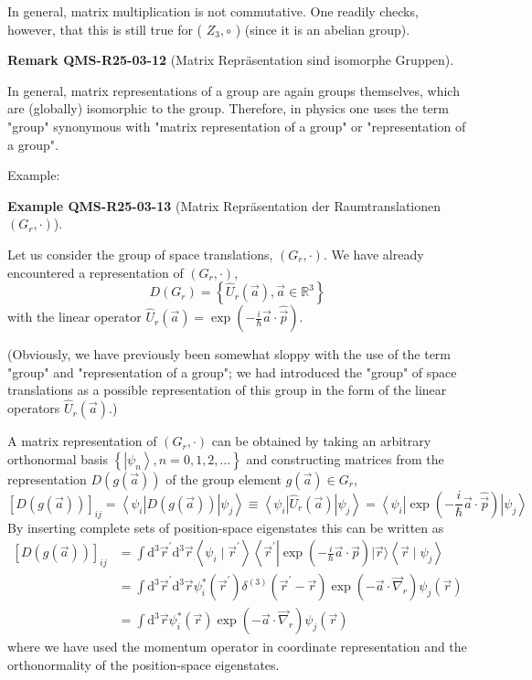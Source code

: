 \documentclass[10pt, letterpaper]{article}
\newcommand{\CustomHeading}[3]{%
  \par\medskip\noindent%
  \textbf{#1 #2} \textnormal{(#3)}.\enskip%
}
\newenvironment{REM}[2]{\begin{unitbox}\CustomHeading{Remark}{#1}{#2}}{\end{unitbox}}
\newenvironment{EXA}[2]{\begin{unitbox}\CustomHeading{Example}{#1}{#2}}{\end{unitbox}}
\begin{document}
In general, matrix multiplication is not commutative. One readily checks, however, that this is still true for ( $Z_{3}, \circ$ ) (since it is an abelian group).



\begin{REM}{QMS-R25-03-12}{Matrix Repräsentation sind isomorphe Gruppen}
In general, matrix representations of a group are again groups themselves, which are (globally) isomorphic to the group. Therefore, in physics one uses the term "group" synonymous with "matrix representation of a group" or "representation of a group".
\end{REM}

Example: 

\begin{EXA}{QMS-R25-03-13}{Matrix Repräsentation der Raumtranslationen $(G_{r}, \cdot)$}
Let us consider the group of space translations, $\left(G_{r}, \cdot\right)$. We have already encountered a representation of $\left(G_{r}, \cdot\right)$,
$$
D\left(G_{r}\right)=\left\{\hat{U}_{r}(\vec{a}), \vec{a} \in \mathbb{R}^{3}\right\}
$$
with the linear operator $\hat{U}_{r}(\vec{a})=\exp \left(-\frac{i}{\hbar} \vec{a} \cdot \hat{\vec{p}}\right)$. 

(Obviously, we have previously been somewhat sloppy with the use of the term "group" and "representation of a group"; we had introduced the "group" of space translations as a possible representation of this group in the form of the linear operators $\hat{U}_{r}(\vec{a})$.) 

A matrix representation of $(G_{r}, \cdot)$ can be obtained by taking an arbitrary orthonormal basis $\left\{\left|\psi_{n}\right\rangle, n=0,1,2, \ldots\right\}$ and constructing matrices from the representation $D(g(\vec{a}))$ of the group element $g(\vec{a}) \in G_{r}$,
$$
[D(g(\vec{a}))]_{i j}=\left\langle\psi_{i}\right| D(g(\vec{a}))\left|\psi_{j}\right\rangle \equiv\left\langle\psi_{i}\right| \hat{U}_{r}(\vec{a})\left|\psi_{j}\right\rangle=\left\langle\psi_{i}\right| \exp \left(-\frac{i}{\hbar} \vec{a} \cdot \hat{\vec{p}}\right)\left|\psi_{j}\right\rangle
$$
By inserting complete sets of position-space eigenstates this can be written as
$$
\begin{aligned}
{[D(g(\vec{a}))]_{i j} } & =\int \mathrm{d}^{3} \vec{r}^{\prime} \mathrm{d}^{3} \vec{r}\left\langle\psi_{i} \mid \vec{r}^{\prime}\right\rangle\left\langle\vec{r}^{\prime}\right| \exp \left(-\frac{i}{\hbar} \vec{a} \cdot \hat{\vec{p}}\right)|\vec{r}\rangle\left\langle\vec{r} \mid \psi_{j}\right\rangle \\
& =\int \mathrm{d}^{3} \vec{r}^{\prime} \mathrm{d}^{3} \vec{r} \psi_{i}^{*}\left(\vec{r}^{\prime}\right) \delta^{(3)}\left(\vec{r}^{\prime}-\vec{r}\right) \exp \left(-\vec{a} \cdot \vec{\nabla}_{r}\right) \psi_{j}(\vec{r}) \\
& =\int \mathrm{d}^{3} \vec{r} \psi_{i}^{*}(\vec{r}) \exp \left(-\vec{a} \cdot \vec{\nabla}_{r}\right) \psi_{j}(\vec{r})
\end{aligned}
$$
where we have used the momentum operator in coordinate representation and the orthonormality of the position-space eigenstates.
\end{EXA}
\end{document}
